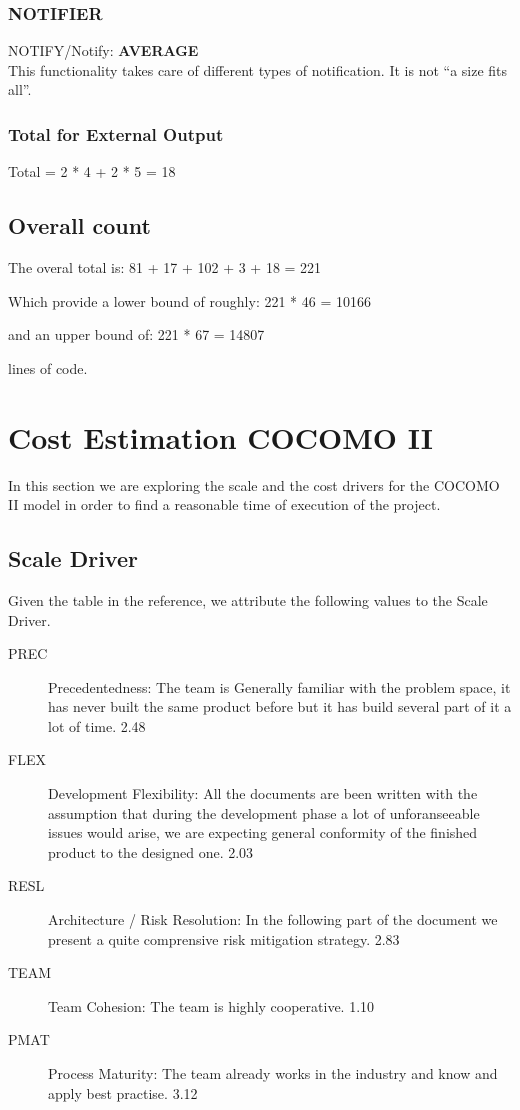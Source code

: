 \documentclass[11pt]{article} %
\newcommand{\extInput}[3]{ #1:  \textbf{#2} \\ #3  }
\begin{document}
\subsubsection{NOTIFIER}
\begin{description}
	\item \extInput
		{NOTIFY/Notify}
		{AVERAGE}
		{This functionality takes care of different types of notification. It is not ``a size fits all''.}
\end{description}

\subsubsection{Total for External Output}
Total = 2 * 4 + 2 * 5 = 18

\subsection{Overall count}

The overal total is: \hfill
81 + 17 + 102 + 3 + 18 = 221

Which provide a lower bound of roughly:\hfill
221 * 46 = 10166

and an upper bound of: 
\hfill
221 * 67 = 14807

lines of code.

\section{Cost Estimation COCOMO II}

In this section we are exploring the scale and the cost drivers for the COCOMO II model in order to find a reasonable time of execution of the project.

\subsection{Scale Driver}

Given the table in the reference, we attribute the following values to the Scale Driver.

\begin{description}
	\item[PREC] Precedentedness: The team is Generally familiar with the problem space, it has never built the same product before but it has build several part of it a lot of time. 2.48
	\item[FLEX] Development Flexibility: All the documents are been written with the assumption that during the development phase a lot of unforanseeable issues would arise, we are expecting general conformity of the finished product to the designed one. 2.03
	\item[RESL] Architecture / Risk Resolution: In the following part of the document we present a quite comprensive risk mitigation strategy. 2.83
	\item[TEAM] Team Cohesion: The team is highly cooperative. 1.10
	\item[PMAT] Process Maturity: The team already works in the industry and know and apply best practise. 3.12
\end{description}
\end{document}

